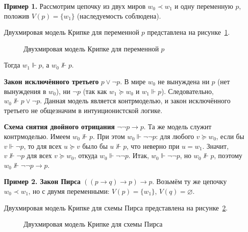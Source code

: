 \documentclass[14pt, russian]{scrartcl}
\begin{document}
\textbf{Пример 1.} Рассмотрим цепочку из двух миров $w_0 \prec w_1$ и одну
переменную $p$, положив $V(p) = \{w_1\}$ (наследуемость соблюдена).

Двухмировая модель Крипке для переменной $p$ представлена на рисунке~\ref{fig:kripke-chain-p}.

\begin{figure}[!htb]
\centering
{}
\caption{Двухмировая модель Крипке для переменной $p$}
\label{fig:kripke-chain-p}
\end{figure}

Тогда $w_1 \Vdash p$, а $w_0 \not\Vdash p$.

\textbf{Закон исключённого третьего} $p \lor \neg p$. В мире $w_0$ не вынуждена
ни $p$ (нет вынуждения в $w_0$), ни $\neg p$ (так как $w_1 \succeq w_0$ и $w_1
\Vdash p$). Следовательно, $w_0 \not\Vdash p \lor \neg p$. Данная модель
является контрмоделью, и закон исключённого третьего не общезначим в
интуиционистской логике.

\textbf{Схема снятия двойного отрицания} $\neg\neg p \rightarrow p$. Та же модель
служит контрмоделью. Имеем $w_0 \not\Vdash p$. При этом $w_0 \Vdash \neg\neg p$:
для любого $v \succeq w_0$, если бы $v \Vdash \neg p$, то для всех $u \succeq v$
было бы $u \not\Vdash p$, что неверно при $u = w_1$. Значит,
$v \not\Vdash \neg p$ для всех $v \succeq w_0$, откуда $w_0 \Vdash \neg\neg p$.
Итак, $w_0 \Vdash \neg\neg p$, но $w_0 \not\Vdash p$, поэтому
$w_0 \not\Vdash \neg\neg p \rightarrow p$.

\textbf{Пример 2. Закон Пирса} $((p \rightarrow q) \rightarrow p) \rightarrow p$.
Возьмём ту же цепочку $w_0 \prec w_1$, но с двумя переменными: $V(p) = \{w_1\}$,
$V(q) = \varnothing$.

Двухмировая модель Крипке для схемы Пирса представлена на рисунке~\ref{fig:kripke-chain-peirce}.

\begin{figure}[!htb]
\centering
{}
\caption{Двухмировая модель Крипке для схемы Пирса}
\label{fig:kripke-chain-peirce}
\end{figure}
\end{document}
